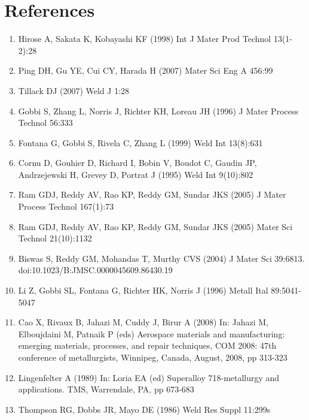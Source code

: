 \documentclass[10pt]{article}
\begin{document}
\section*{References}
\begin{enumerate}
  \item Hirose A, Sakata K, Kobayashi KF (1998) Int J Mater Prod Technol 13(1-2):28

  \item Ping DH, Gu YE, Cui CY, Harada H (2007) Mater Sci Eng A 456:99

  \item Tillack DJ (2007) Weld J 1:28

  \item Gobbi S, Zhang L, Norris J, Richter KH, Loreau JH (1996) J Mater Process Technol 56:333

  \item Fontana G, Gobbi S, Rivela C, Zhang L (1999) Weld Int 13(8):631

  \item Cornu D, Gouhier D, Richard I, Bobin V, Boudot C, Gaudin JP, Andrzejewski H, Grevey D, Portrat J (1995) Weld Int 9(10):802

  \item Ram GDJ, Reddy AV, Rao KP, Reddy GM, Sundar JKS (2005) J Mater Process Technol 167(1):73

  \item Ram GDJ, Reddy AV, Rao KP, Reddy GM, Sundar JKS (2005) Mater Sci Technol 21(10):1132

  \item Biswas S, Reddy GM, Mohandas T, Murthy CVS (2004) J Mater Sci 39:6813. doi:10.1023/B:JMSC.0000045609.86430.19

  \item Li Z, Gobbi SL, Fontana G, Richter HK, Norris J (1996) Metall Ital 89:5041-5047

  \item Cao X, Rivaux B, Jahazi M, Cuddy J, Birur A (2008) In: Jahazi M, Elboujdaini M, Patnaik P (eds) Aerospace materials and manufacturing: emerging materials, processes, and repair techniques, COM 2008: 47th conference of metallurgists, Winnipeg, Canada, August, 2008, pp 313-323

  \item Lingenfelter A (1989) In: Loria EA (ed) Superalloy 718-metallurgy and applications. TMS, Warrendale, PA, pp 673-683

  \item Thompson RG, Dobbs JR, Mayo DE (1986) Weld Res Suppl 11:299s


\end{enumerate}
\end{document}
